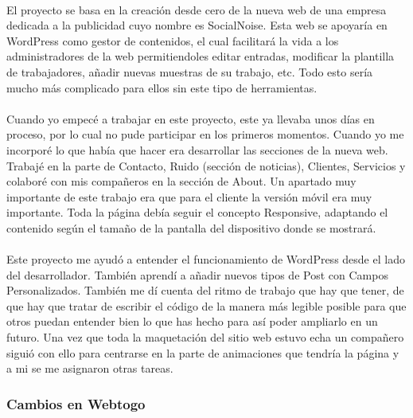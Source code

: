 \documentclass[10pt, a4paper,spanish]{article}
\begin{document}
                \paragraph{}
                El proyecto se basa en la creación desde cero de la nueva web de una empresa dedicada a la publicidad cuyo nombre es SocialNoise. Esta web se apoyaría en WordPress como gestor de contenidos, el cual facilitará la vida a los administradores de la web permitiendoles editar entradas, modificar la plantilla de trabajadores, añadir nuevas muestras de su trabajo, etc. Todo esto sería mucho más complicado para ellos sin este tipo de herramientas.

                \paragraph{}
                Cuando yo empecé a trabajar en este proyecto, este ya llevaba unos días en proceso, por lo cual no pude participar en los primeros momentos. Cuando yo me incorporé lo que había que hacer era desarrollar las  secciones de la nueva web. Trabajé en la parte de Contacto, Ruido (sección de noticias), Clientes, Servicios y colaboré con mis compañeros en  la sección de About. Un apartado muy importante de este trabajo era que para el cliente la versión móvil era muy importante. Toda la página debía seguir el concepto Responsive, adaptando el contenido según el tamaño de la pantalla del dispositivo donde se mostrará.

                \paragraph{}
                Este proyecto me ayudó a entender el funcionamiento de WordPress desde el lado del desarrollador. También aprendí a añadir nuevos tipos de Post con Campos Personalizados. También me dí cuenta del ritmo de trabajo que hay que tener, de que hay que tratar de escribir el código de la manera más legible posible para que otros puedan entender bien lo que has hecho para así poder ampliarlo en un futuro. Una vez que toda la maquetación del sitio web estuvo echa un compañero siguió con ello para centrarse en la parte de animaciones que tendría la página y a mi se me asignaron otras tareas.


            \subsubsection{Cambios en Webtogo}
\end{document}
